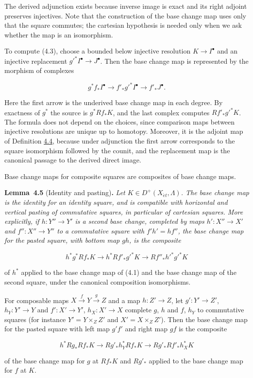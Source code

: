 \documentclass[11pt]{article}
\newenvironment{bpstatement}[2]{\par\addvspace{0.6\baselineskip}\noindent\textbf{#1}#2\textbf{.}\enspace\ignorespaces}
  {\par\addvspace{0.4\baselineskip}}
\newenvironment{bpstatementit}[2]{\begin{bpstatement}{#1}{#2}\itshape\ignorespaces}{\end{bpstatement}}
\begin{document}
\label{bp298}%
The derived adjunction exists because inverse image is exact and its right adjoint preserves injectives. Note that the construction of the base change map uses only that the square commutes; the cartesian hypothesis is needed only when we ask whether the map is an isomorphism.

To compute (4.3), choose a bounded below injective resolution \(K\to I^\bullet\) and an injective replacement \(g'^*I^\bullet\to J^\bullet\). Then the base change map is represented by the morphism of complexes

\[
g^*f_*I^\bullet
\longrightarrow
f'_*g'^*I^\bullet\longrightarrow f'_*J^\bullet.
\tag{4.4}
\]

Here the first arrow is the underived base change map in each degree. By exactness of \(g^*\) the source is \(g^*Rf_*K\), and the last complex computes \(Rf'_*g'^*K\). The formula does not depend on the choices, since comparison maps between injective resolutions are unique up to homotopy. Moreover, it is the adjoint map of Definition \hyperref[bp297]{4.4}, because under adjunction the first arrow corresponds to the square isomorphism followed by the counit, and the replacement map is the canonical passage to the derived direct image.

Base change maps for composite squares are composites of base change maps.

\label{bp299}%
\begin{bpstatementit}{Lemma~4.5}{ (Identity and pasting)}
Let \(K\in D^+(X_{\acute{e}t},\Lambda)\). The base change map is the identity for an identity square, and is compatible with horizontal and vertical pasting of commutative squares, in particular of cartesian squares. More explicitly, if \(h:Y''\to Y'\) is a second base change, completed by maps \(h':X''\to X'\) and \(f'':X''\to Y''\) to a commutative square with \(f'h'=hf''\), the base change map for the pasted square, with bottom map \(gh\), is the composite

\[
h^*g^*Rf_*K
\longrightarrow
h^*Rf'_*g'^*K
\longrightarrow
Rf''_*h'^*g'^*K
\]

of \(h^*\) applied to the base change map of (4.1) and the base change map of the second square, under the canonical composition isomorphisms.

For composable maps \(X\xrightarrow{f}Y\xrightarrow{g}Z\) and a map \(h:Z'\to Z\), let \(g':Y'\to Z'\), \(h_Y:Y'\to Y\) and \(f':X'\to Y'\), \(h_X:X'\to X\) complete \(g\), \(h\) and \(f\), \(h_Y\) to commutative squares (for instance \(Y'=Y\times_ZZ'\) and \(X'=X\times_ZZ'\)). Then the base change map for the pasted square with left map \(g'f'\) and right map \(gf\) is the composite

\[
h^*Rg_*Rf_*K
\longrightarrow
Rg'_*h_Y^*Rf_*K
\longrightarrow
Rg'_*Rf'_*h_X^*K
\]

of the base change map for \(g\) at \(Rf_*K\) and \(Rg'_*\) applied to the base change map for \(f\) at \(K\).
\end{bpstatementit}
\end{document}
